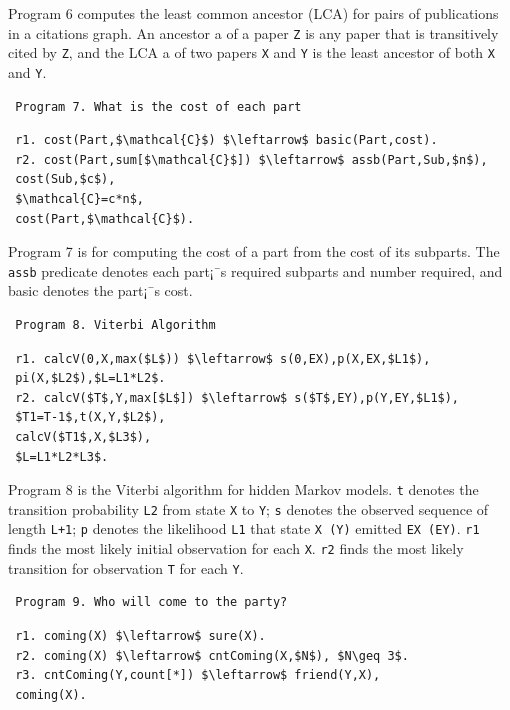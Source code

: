 \begin{appendix}
 Program 6 \cite{Wang:2015:AFR:2824032.2824052} computes the least common ancestor (LCA) for pairs of publications in a citations graph. An ancestor a of a paper \texttt{Z} is any paper that is transitively cited by \texttt{Z}, and the LCA a of two papers \texttt{X} and \texttt{Y} is the least ancestor of both \texttt{X} and \texttt{Y}.
 
 \begin{verbatim}
 Program 7. What is the cost of each part
 \end{verbatim}\vspace{-0.1in}\small
 \begin{lstlisting}
 r1. cost(Part,$\mathcal{C}$) $\leftarrow$ basic(Part,cost).
 r2. cost(Part,sum[$\mathcal{C}$]) $\leftarrow$ assb(Part,Sub,$n$),
 cost(Sub,$c$),
 $\mathcal{C}=c*n$,
 cost(Part,$\mathcal{C}$).
 \end{lstlisting}
 \normalsize
 
 Program 7 \cite{7113340} is for computing the cost of a part from the cost of its subparts. The \texttt{assb} predicate denotes each part¡¯s required subparts and number required, and basic denotes the part¡¯s cost.
 
 \begin{verbatim}
 Program 8. Viterbi Algorithm
 \end{verbatim}\vspace{-0.1in}\small
 \begin{lstlisting}
 r1. calcV(0,X,max($L$)) $\leftarrow$ s(0,EX),p(X,EX,$L1$),
 pi(X,$L2$),$L=L1*L2$.
 r2. calcV($T$,Y,max[$L$]) $\leftarrow$ s($T$,EY),p(Y,EY,$L1$),
 $T1=T-1$,t(X,Y,$L2$),
 calcV($T1$,X,$L3$),
 $L=L1*L2*L3$.
 \end{lstlisting}
 \normalsize
 
 Program 8 \cite{7113340} is the Viterbi algorithm for hidden Markov models. \texttt{t} denotes the transition probability \texttt{L2} from state \texttt{X} to \texttt{Y}; \texttt{s} denotes the observed sequence of length \texttt{L+1}; \texttt{p} denotes the likelihood \texttt{L1} that state \texttt{X (Y)} emitted \texttt{EX (EY)}. \texttt{r1} finds the most likely initial observation for each \texttt{X}. \texttt{r2} finds the most likely transition for observation \texttt{T} for each \texttt{Y}.
 
 \begin{verbatim}
 Program 9. Who will come to the party?
 \end{verbatim}\small
 \begin{lstlisting}
 r1. coming(X) $\leftarrow$ sure(X).
 r2. coming(X) $\leftarrow$ cntComing(X,$N$), $N\geq 3$.
 r3. cntComing(Y,count[*]) $\leftarrow$ friend(Y,X),
 coming(X).
 \end{lstlisting}
 \normalsize
 

\end{appendix}

